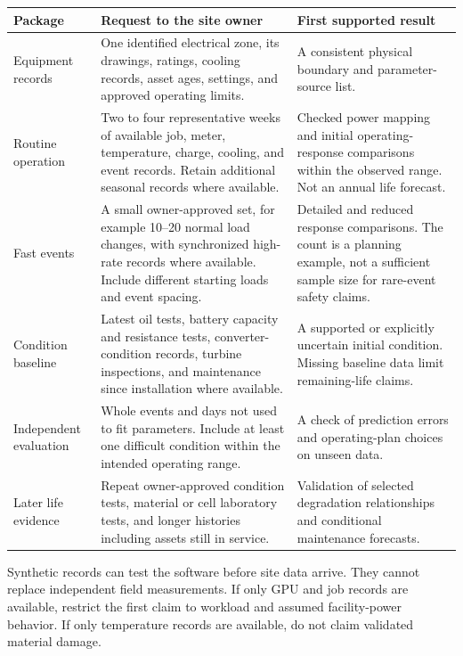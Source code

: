 \documentclass[11pt,a4paper]{report}
\begin{document}
\begin{longtable}{L{0.17\textwidth}L{0.36\textwidth}L{0.35\textwidth}}
\toprule Package & Request to the site owner & First supported result \\ \midrule\endhead
Equipment records & One identified electrical zone, its drawings, ratings, cooling records, asset ages, settings, and approved operating limits. & A consistent physical boundary and parameter-source list. \\
Routine operation & Two to four representative weeks of available job, meter, temperature, charge, cooling, and event records. Retain additional seasonal records where available. & Checked power mapping and initial operating-response comparisons within the observed range. Not an annual life forecast. \\
Fast events & A small owner-approved set, for example 10--20 normal load changes, with synchronized high-rate records where available. Include different starting loads and event spacing. & Detailed and reduced response comparisons. The count is a planning example, not a sufficient sample size for rare-event safety claims. \\
Condition baseline & Latest oil tests, battery capacity and resistance tests, converter-condition records, turbine inspections, and maintenance since installation where available. & A supported or explicitly uncertain initial condition. Missing baseline data limit remaining-life claims. \\
Independent evaluation & Whole events and days not used to fit parameters. Include at least one difficult condition within the intended operating range. & A check of prediction errors and operating-plan choices on unseen data. \\
Later life evidence & Repeat owner-approved condition tests, material or cell laboratory tests, and longer histories including assets still in service. & Validation of selected degradation relationships and conditional maintenance forecasts. \\
\bottomrule
\end{longtable}

Synthetic records can test the software before site data arrive.
They cannot replace independent field measurements.
If only GPU and job records are available, restrict the first claim to workload and assumed facility-power behavior.
If only temperature records are available, do not claim validated material damage.
\end{document}
